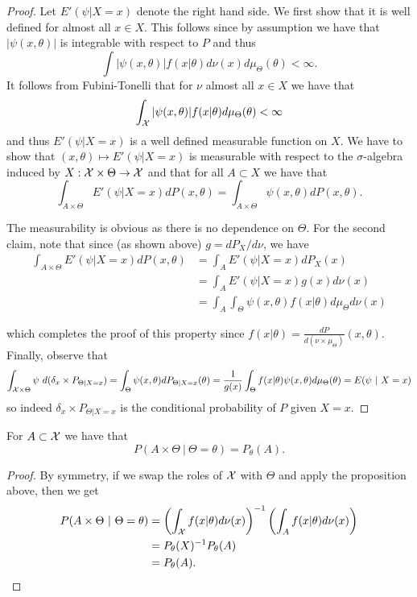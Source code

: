 \documentclass[twoside, a4paper, 10pt]{amsart}
\begin{document}
\begin{proof} Let $E'(\psi |X=x)$ denote the right hand side. We first show that it is well defined for almost all $x \in X$. This follows since by assumption we have that $|\psi(x,\theta)|$ is integrable with respect to $P$ and thus $$\int |\psi(x,\theta)| f(x|\theta) d\nu(x) d\mu_{\Theta} (\theta) < \infty.$$ It follows from Fubini-Tonelli that for $\nu$ almost all $x \in X$ we have that $$\int_{\mathcal{X}} |\psi(x,\theta)| f(x|\theta) d\mu_{\Theta}(\theta) < \infty$$ and thus $E'(\psi | X=x)$ is a well defined measurable function on $X$. We have to show that $(x, \theta) \mapsto E'(\psi |X=x)$ is measurable with respect to the $\sigma$-algebra induced by $X: \mathcal{X} \times \Theta \to \mathcal{X}$ and that for all $A \subset X$ we have that $$\int_{A \times \Theta} E'(\psi |X=x) dP(x, \theta) = \int_{A \times \Theta} \psi(x,\theta) dP(x, \theta).$$

The measurability is obvious as there is no dependence on $\Theta$. For the second claim, note that since (as shown above) $g = dP_X/d\nu$, we have 
\begin{align*} \int_{A \times \Theta} E'(\psi |X=x) dP(x, \theta) &= \int_{A} E'(\psi |X=x) dP_X(x) \\
&=\int_{A} E'(\psi |X=x) g(x) d\nu(x) \\ 
&= \int_{A} \int_{\Theta} \psi(x, \theta) f(x|\theta) d\mu_{\Theta} d\nu(x)\end{align*}

which completes the proof of this property since $f(x|\theta) = \frac{dP}{d(\nu \times \mu_{\Theta})}(x,\theta) $. Finally, observe that $$\int _{\mathcal{X} \times \Theta} \psi ~d(\delta_x \times P_{\Theta|X=x}) = \int_{\Theta} \psi(x,\theta) dP_{\Theta |X=x}(\theta) = \frac{1}{g(x)} \int_{\Theta} f(x|\theta) \psi(x,\theta) d\mu_{\Theta}(\theta) = E(\psi ~|~ X=x) $$ so indeed $\delta_x \times P_{\Theta|X=x}$ is the conditional probability of $P$ given $X=x$. \end{proof}

\begin{prop} For $A \subset \mathcal{X}$ we have that $$P(A \times \Theta ~|~ \Theta = \theta) = P_{\theta}(A).$$

\end{prop}
\begin{proof}
By symmetry, if we swap the roles of $\mathcal{X}$ with $\Theta$ and apply the proposition above, then we get 
\begin{align*} P(A \times \Theta ~|~ \Theta = \theta) &= \left(\int_{\mathcal{X}} f(x|\theta) d\nu(x) \right)^{-1} \left(\int_{A} f(x|\theta) d\nu(x) \right) \\
&= P_{\theta}(X)^{-1} P_{\theta}(A) \\
&= P_{\theta}(A). \end{align*} \end{proof}
\end{document}
